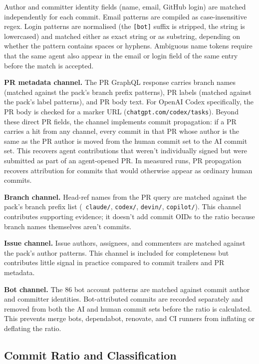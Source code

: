 Author and committer identity fields (name, email, GitHub login) are matched independently for each commit. Email patterns are compiled as case-insensitive regex. Login patterns are normalised (the \texttt{[bot]} suffix is stripped, the string is lowercased) and matched either as exact string or as substring, depending on whether the pattern contains spaces or hyphens. Ambiguous name tokens require that the same agent also appear in the email or login field of the same entry before the match is accepted.

\textbf{PR metadata channel.} The PR GraphQL response carries branch names (matched against the pack's branch prefix patterns), PR labels (matched against the pack's label patterns), and PR body text. For OpenAI Codex specifically, the PR body is checked for a marker URL (\texttt{chatgpt.com/codex/tasks}). Beyond these direct PR fields, the channel implements commit propagation: if a PR carries a hit from any channel, every commit in that PR whose author is the same as the PR author is moved from the human commit set to the AI commit set. This recovers agent contributions that weren't individually signed but were submitted as part of an agent-opened PR. In measured runs, PR propagation recovers attribution for commits that would otherwise appear as ordinary human commits.

\textbf{Branch channel.} Head-ref names from the PR query are matched against the pack's branch prefix list (\eg\ \texttt{claude/}, \texttt{codex/}, \texttt{devin/}, \texttt{copilot/}). This channel contributes supporting evidence; it doesn't add commit OIDs to the ratio because branch names themselves aren't commits.

\textbf{Issue channel.} Issue authors, assignees, and commenters are matched against the pack's author patterns. This channel is included for completeness but contributes little signal in practice compared to commit trailers and PR metadata.

\textbf{Bot channel.} The 86 bot account patterns are matched against commit author and committer identities. Bot-attributed commits are recorded separately and removed from both the AI and human commit sets before the ratio is calculated. This prevents merge bots, dependabot, renovate, and CI runners from inflating or deflating the ratio.

\subsection{Commit Ratio and Classification}


